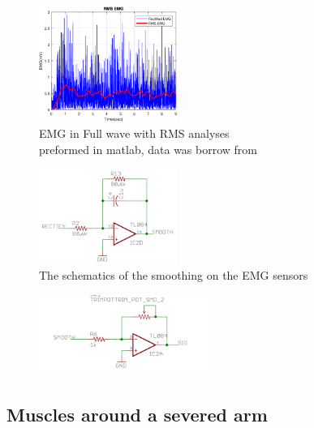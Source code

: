 \begin{multicols}{2}
\begin{figure}[H]
    \centering
    \includegraphics[width=0.4\textwidth]{Figures/EMG/epsFigRMS}
    \caption{EMG in Full wave with RMS analyses\\ preformed in matlab, data was borrow from\cite{EMGDATA}}
    \label{ref:Wasmooth}
\end{figure}
\columnbreak
\begin{figure}[H]
    \centering
    \includegraphics[width=0.4\textwidth]{Figures/EMG/Smooth.PNG}
    \caption{The schematics of the smoothing on the EMG sensors\cite{SparkfunScematicEMG}}
    \label{fig:smooth}
\end{figure} 
\end{multicols}




\begin{figure}[H]
    \centering
    \includegraphics[width=0.5\textwidth]{Figures/EMG/FinalGain.PNG}
    \caption{}
    \label{fig:finalGain}
\end{figure} 


\subsection*{Muscles around a severed arm}


